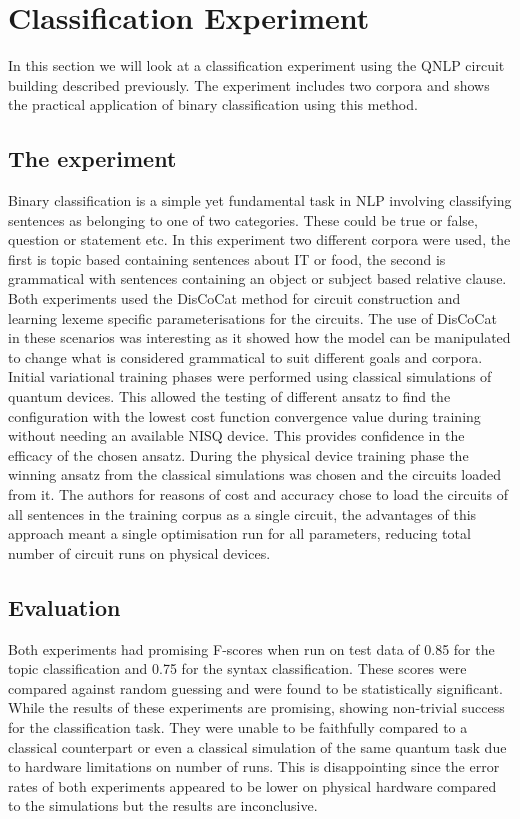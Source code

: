 \documentclass[a4paper,twocolumn,11pt]{quantumarticle}
\begin{document}
    \section{Classification Experiment}\label{sec:classification_exp}
    In this section we will look at a classification experiment using the QNLP circuit building
    described previously.
    The experiment includes two corpora and shows the practical application of binary classification using this method.
    \subsection{The experiment}\label{subsec:binary-classification}
    Binary classification is a simple yet fundamental task in NLP involving classifying sentences
    as belonging to one of two categories.
    These could be true or false, question or statement etc.
    In this experiment two different corpora were used, the first is topic based containing sentences
    about IT or food\cite{qnlp_in_prac}, the second is grammatical with sentences containing an object or
    subject based relative clause.
    Both experiments used the DisCoCat method for circuit construction and learning
    lexeme specific parameterisations for the circuits.
    The use of DisCoCat in these scenarios was interesting as it showed how the model can be manipulated to change
    what is considered grammatical to suit different goals and corpora\cite{qnlp_in_prac}.
    \newline
    Initial variational training phases were performed using classical simulations of quantum devices.
    This allowed the testing of different ansatz to find the configuration with the lowest cost function
    convergence value during training without needing an available NISQ device\cite{qnlp_in_prac}.
    This provides confidence in the efficacy of the chosen ansatz.
    During the physical device training phase the winning ansatz from the classical simulations was chosen and the circuits
    loaded from it.
    The authors for reasons of cost and accuracy chose to load the circuits of all sentences in the training corpus as
    a single circuit, the advantages of this approach meant a single optimisation run for all parameters, reducing total
    number of circuit runs on physical devices.
    \subsection{Evaluation}\label{subsec:evaluation}
    Both experiments had promising F-scores when run on test data of 0.85 for the topic classification and 0.75 for
    the syntax classification\cite{qnlp_in_prac}.
    These scores were compared against random guessing and were found to be statistically significant\cite{qnlp_in_prac}.
    While the results of these experiments are promising, showing non-trivial success for the classification task.
    They were unable to be faithfully compared to a classical counterpart or even a classical simulation of the same
    quantum task due to hardware limitations on number of runs.
    This is disappointing since the error rates of both experiments appeared to be lower on physical hardware compared
    to the simulations but the results are inconclusive\cite{qnlp_in_prac}.
\end{document}
